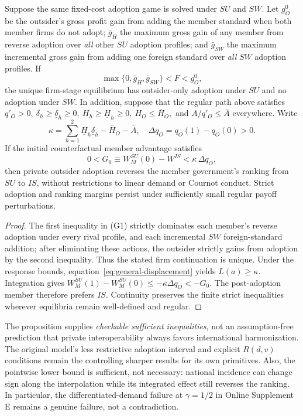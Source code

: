 \begin{proposition}
\label{prop:general-conduct-neutral}
Suppose the same fixed-cost adoption game is solved under \(SU\) and
\(SW\).  Let \(g_O^0\) be the outsider's gross profit gain from adding
the member standard when both member firms do not adopt;
\(\bar g_H\) the maximum gross gain of any member from reverse
adoption over \emph{all} other \(SU\) adoption profiles; and
\(\bar g_{SW}\) the maximum incremental gross gain from adding one
foreign standard over \emph{all} \(SW\) adoption profiles.
If
\[
 \max\{0,\bar g_H,\bar g_{SW}\}<F<g_O^0,
 \tag{G1}
\]
the unique firm-stage equilibrium has outsider-only adoption under
\(SU\) and no adoption under \(SW\).  In addition, suppose that the
regular path above satisfies \(q'_O>0,\ \delta_h\ge\underline\delta_h
\ge0,\ H_h\ge\underline H_h\ge0,\ H_O\le\overline H_O,\)
and \(A/q'_O\le\overline A\) everywhere.  Write
\[
 \kappa=\sum_{h=1}^{2}\underline H_h\underline\delta_h
       -\overline H_O-\overline A,\quad
 \Delta q_O=q_O(1)-q_O(0)>0.
\]
If the initial counterfactual member advantage satisfies
\begin{equation}
 0<G_0\equiv W_M^{SU}(0)-W^{IS}
   <\kappa\,\Delta q_O,
 \tag{G2}
\end{equation}
then private outsider adoption reverses the member government's
ranking from \(SU\) to \(IS\), without restrictions to linear demand
or Cournot conduct.  Strict adoption and ranking margins persist
under sufficiently small regular payoff perturbations.
\end{proposition}
\begin{proof}
The first inequality in (G1) strictly dominates each member's
reverse adoption under every rival profile, and each incremental
\(SW\) foreign-standard addition; after eliminating these actions,
the outsider strictly gains from adoption by the second inequality.
Thus the stated firm continuation is unique.  Under the response
bounds, equation~\eqref{eq:general-displacement} yields
\(L(a)\ge\kappa\).  Integration gives
\(W_M^{SU}(1)-W_M^{SU}(0)\le-\kappa\Delta q_O<-G_0\).
The post-adoption member therefore prefers \(IS\).  Continuity
preserves the finite strict inequalities wherever equilibria remain
well-defined and regular.
\end{proof}

The proposition supplies \emph{checkable sufficient inequalities},
not an assumption-free prediction that private interoperability
always favors international harmonization.  The original model's
less restrictive adoption interval and explicit \(R(d,v)\) conditions
remain the controlling sharper results for its own primitives.
Also, the pointwise lower bound is sufficient, not necessary:
national incidence can change sign along the interpolation while
its integrated effect still reverses the ranking.  In particular,
the differentiated-demand failure at \(\gamma=1/2\) in Online
Supplement E remains a genuine failure, not a contradiction.


